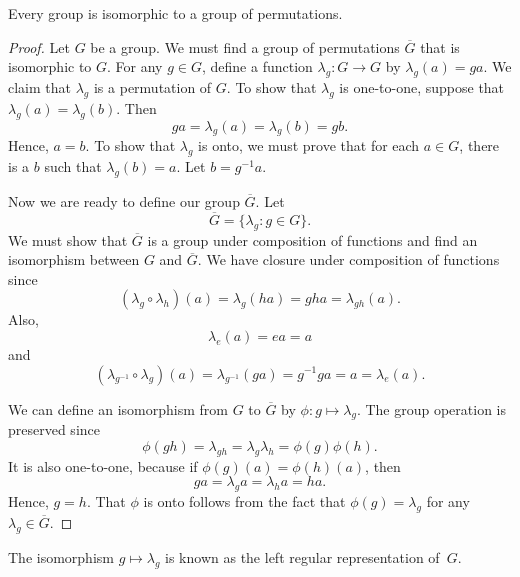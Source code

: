 \begin{theorem}[Cayley]\label{isomorph_theorem_6}
Every group is isomorphic to a group of permutations.
\end{theorem}

\begin{proof}
Let $G$ be a group.  We must find a group of permutations $\overline{G}$ that is isomorphic to $G$.  For any $g \in G$, define a  function $\lambda_g : G \rightarrow G$ by $\lambda_g(a) = ga$.  We claim that $\lambda_g$ is a permutation of $G$.  To show that $\lambda_g$ is one-to-one, suppose that $\lambda_g(a) = \lambda_g(b)$.  Then  
$$
ga =\lambda_g(a) = \lambda_g(b) = gb.
$$
Hence, $a = b$.  To show that $\lambda_g$ is onto, we must prove that for each $a \in G$, there is a $b$ such that $\lambda_g (b) = a$.  Let $b = g^{-1} a$.  

Now we are ready to define our group $\overline{G}$. Let
$$
\overline{G} = \{ \lambda_g : g \in G \}.
$$
We must show that $\overline{G}$ is a group under composition of functions and find an isomorphism between $G$ and $\overline{G}$.  We have closure under composition of functions since 
$$
(\lambda_g \circ \lambda_h )(a) = \lambda_g(ha) = gha = \lambda_{gh} (a).
$$
Also,
$$
\lambda_e (a) = ea = a
$$
and
$$
(\lambda_{g^{-1}} \circ \lambda_g) (a) = \lambda_{g^{-1}} (ga) = g^{-1} g a = a = \lambda_e (a).
$$

We can define an isomorphism from $G$ to $\overline{G}$ by $\phi : g
\mapsto \lambda_g$. The group operation is preserved since
$$
\phi(gh) = \lambda_{gh} = \lambda_g \lambda_h = \phi(g) \phi(h).
$$
It is also one-to-one, because if $\phi(g)(a) = \phi(h)(a)$, then
$$
ga = \lambda_g a = \lambda_h a=  ha.
$$
Hence, $g = h$.  That $\phi$ is onto follows from the fact that $\phi( g ) = \lambda_g$ for any $\lambda_g \in \overline{G}$. 
\end{proof}

\medskip

The isomorphism $g \mapsto \lambda_g$ is known as the {\bfi left regular representation\/} of~$G$. 


\histhead

 

